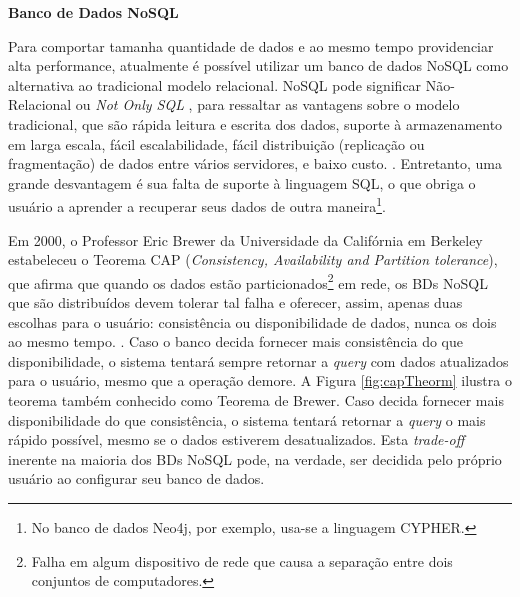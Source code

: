 %
%

\textbf{Banco de Dados NoSQL}

\indent Para comportar tamanha quantidade de dados e ao mesmo tempo providenciar alta performance, atualmente é possível utilizar um banco de dados NoSQL como alternativa ao tradicional modelo relacional. NoSQL pode significar Não-Relacional ou \textit{Not Only SQL}  \cite{cattell11}, para ressaltar as vantagens sobre o modelo tradicional, que são rápida leitura e escrita dos dados, suporte à armazenamento em larga escala, fácil escalabilidade, fácil distribuição (replicação ou fragmentação) de dados entre vários servidores, e baixo custo. \cite{jing12}. Entretanto, uma grande desvantagem é sua falta de suporte à linguagem SQL, o que obriga o usuário a aprender a recuperar seus dados de outra maneira\footnote{No banco de dados Neo4j, por exemplo, usa-se a linguagem CYPHER.}.

\indent Em 2000, o Professor Eric Brewer da Universidade da Califórnia em Berkeley estabeleceu o Teorema CAP (\textit{Consistency, Availability and Partition tolerance}), que afirma que quando os dados estão particionados\footnote{Falha em algum dispositivo de rede que causa a separação entre dois conjuntos de computadores.} em rede, os BDs NoSQL que são distribuídos devem tolerar tal falha e oferecer, assim, apenas duas escolhas para o usuário: consistência ou disponibilidade de dados, nunca os dois ao mesmo tempo. \cite{jing12} \cite{cattell11}. Caso o banco decida fornecer mais consistência do que disponibilidade, o sistema tentará sempre retornar a \textit{query} com dados atualizados para o usuário, mesmo que a operação demore. A Figura \ref{fig:capTheorm} ilustra o teorema também conhecido como Teorema de Brewer. Caso decida fornecer mais disponibilidade do que consistência, o sistema tentará retornar a \textit{query} o mais rápido possível, mesmo se o dados estiverem desatualizados. Esta \textit{trade-off} inerente na maioria dos BDs NoSQL pode, na verdade, ser decidida pelo próprio usuário ao configurar seu banco de dados. \\ 

